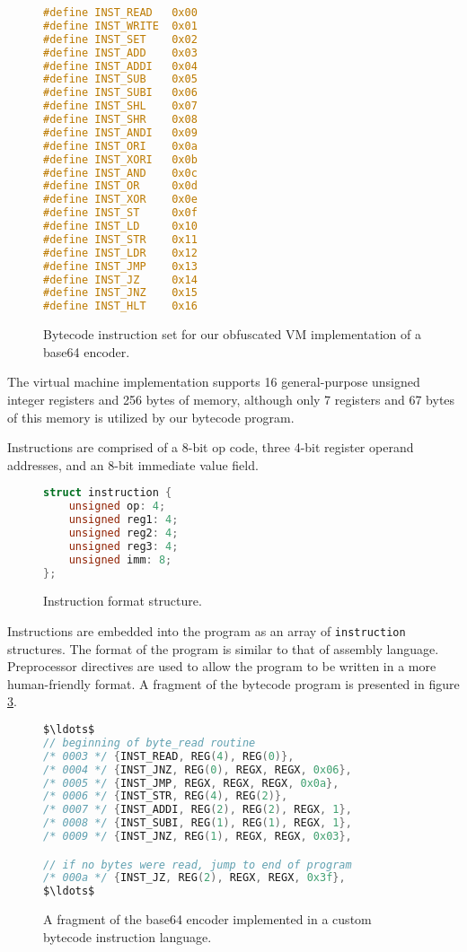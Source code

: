 \documentclass[conference]{IEEEtran}
\begin{document}
\begin{figure}[h]
\begin{lstlisting}[language=C,basicstyle=\footnotesize,mathescape=true]
#define INST_READ   0x00
#define INST_WRITE  0x01
#define INST_SET    0x02
#define INST_ADD    0x03
#define INST_ADDI   0x04
#define INST_SUB    0x05
#define INST_SUBI   0x06
#define INST_SHL    0x07
#define INST_SHR    0x08
#define INST_ANDI   0x09
#define INST_ORI    0x0a
#define INST_XORI   0x0b
#define INST_AND    0x0c
#define INST_OR     0x0d
#define INST_XOR    0x0e
#define INST_ST     0x0f
#define INST_LD     0x10
#define INST_STR    0x11
#define INST_LDR    0x12
#define INST_JMP    0x13
#define INST_JZ     0x14
#define INST_JNZ    0x15
#define INST_HLT    0x16
\end{lstlisting}
\caption{Bytecode instruction set for our obfuscated VM implementation of a base64 encoder.}
\label{fig:vm-instruction-set}
\end{figure}

The virtual machine implementation supports 16 general-purpose unsigned integer registers and 256 bytes of memory, although only 7 registers and 67 bytes of this memory is utilized by our bytecode program.

Instructions are comprised of a 8-bit op code, three 4-bit register operand addresses, and an 8-bit immediate value field.

\begin{figure}[h]
\begin{lstlisting}[language=C,basicstyle=\footnotesize,mathescape=true]
struct instruction {
	unsigned op: 4;
	unsigned reg1: 4;
	unsigned reg2: 4;
	unsigned reg3: 4;
	unsigned imm: 8;
};
\end{lstlisting}
\caption{Instruction format structure.}
\label{fig:vm-instruction-format}
\end{figure}

Instructions are embedded into the program as an array of \texttt{instruction} structures. The format of the program is similar to that of assembly language. Preprocessor directives are used to allow the program to be written in a more human-friendly format. A fragment of the bytecode program is presented in figure \ref{fig:vm-bytecode-program}.

\begin{figure}[h]
\begin{lstlisting}[language=C,basicstyle=\footnotesize,mathescape=true]
$\ldots$
// beginning of byte_read routine
/* 0003 */ {INST_READ, REG(4), REG(0)},
/* 0004 */ {INST_JNZ, REG(0), REGX, REGX, 0x06},
/* 0005 */ {INST_JMP, REGX, REGX, REGX, 0x0a},
/* 0006 */ {INST_STR, REG(4), REG(2)},
/* 0007 */ {INST_ADDI, REG(2), REG(2), REGX, 1},
/* 0008 */ {INST_SUBI, REG(1), REG(1), REGX, 1},
/* 0009 */ {INST_JNZ, REG(1), REGX, REGX, 0x03},

// if no bytes were read, jump to end of program
/* 000a */ {INST_JZ, REG(2), REGX, REGX, 0x3f},
$\ldots$
\end{lstlisting}
\caption{A fragment of the base64 encoder implemented in a custom bytecode instruction language.}
\label{fig:vm-bytecode-program}
\end{figure}
\end{document}

